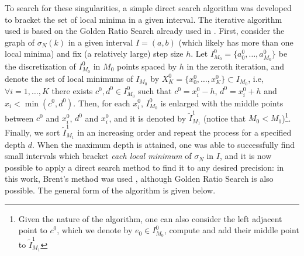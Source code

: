 To search for these singularities, a simple direct search algorithm was developed to bracket the set of local minima in a given interval. The iterative algorithm used is based on the Golden Ratio Search already used in \cite{alves2005method}. First, consider the graph of \(\sigma_N(k)\) in a given interval \(I=(a, b)\) (which likely has more than one local minima) and fix (a relatively large) step size \(h\). Let \(I_{M_0}^0 = \{a_0^0, \dots, a_{M_0}^0\}\) be the discretization of \(I_{M_0}^0\) in \({M_0}\) points spaced by \(h\) in the zeroth iteration, and denote the set of local minimums of \(I_{M_0}\) by \(X^0_K = \{x_0^0, \dots, x_K^0\} \subset I_{M_0}\), i.e, \(\forall i = 1,\dots,K\) there exists \(c^0, d^0 \in I_{M_0}^0\) such that \(c^0 = x_i^0 - h\), \(d^0 = x_i^0 + h\) and \(x_i < \min(c^0, d^0) \). Then, for each \(x_i^0\), \(I_{M_0}^0\) is enlarged with the middle points between \(c^0\) and \(x_i^0\), \(d^0\) and \(x_i^0\), and it is denoted by \(\tilde{I}_{M_1}^1\) (notice that \(M_0 < M_1\))\footnote{Given the nature of the algorithm, one can also consider the left adjacent point to \(c^0\), which we denote by \(e_0 \in I^0_{M_0}\), compute and add their middle point to \(\tilde{I}_{M_1}^1\)}. Finally, we sort \(\tilde{I}_{M_1}^1\) in an increasing order and repeat the process for a specified depth \(d\). When the maximum depth is attained, one was able to successfully find small intervals which bracket \textit{each local minimum} of \(\sigma_N\) in \(I\), and it is now possible to apply a direct search method to find it to any desired precision: in this work, Brent's method was used \cite{brent1971algorithm}, although Golden Ratio Search is also possible. The general form of the algorithm is given below.

